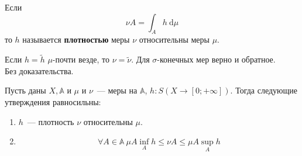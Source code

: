 \documentclass{article}
\begin{document}
    \begin{definition}
        Если
        $$\nu A=\int_A h~\mathrm d\mu$$
        то $h$ называется \textbf{плотностью} меры $\nu$ относительны меры $\mu$.
    \end{definition}
    \begin{property}
        Если $h=\tilde h$ $\mu$-почти везде, то $\nu=\tilde\nu$. Для $\sigma$-конечных мер верно и обратное.\\
        Без доказательства.
    \end{property}
    \begin{theorem}
        \label{Критерий плотности}
        Пусть даны $X,\mathbb A$ и $\mu$ и $\nu$~--- меры на $\mathbb A$, $h\colon S(X\to[0;+\infty])$. Тогда следующие утверждения равносильны:
        \begin{enumerate}
            \item $h$~--- плотность $\nu$ относительны $\mu$.
            \item
            $$
            \forall A\in\mathbb A~\mu A\inf\limits_Ah\leqslant\nu A\leqslant \mu A\sup\limits_Ah
            $$
        \end{enumerate}
    \end{theorem}
\end{document}
